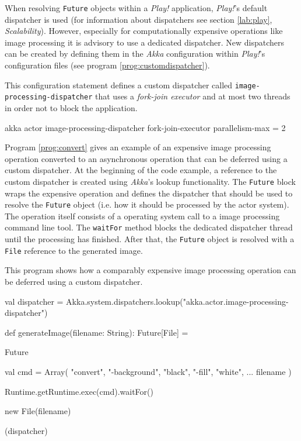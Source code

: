 When resolving \texttt{Future} objects within a \textit{Play!} application, \textit{Play!}'s default dispatcher is used (for information about dispatchers see section \ref{lab:play}, \textit{Scalability}). However, especially for computationally expensive operations like image processing it is advisory to use a dedicated dispatcher. New dispatchers can be created by defining them in the \textit{Akka} configuration within \textit{Play!}'s configuration files (see program \ref{prog:customdispatcher}).
\begin{program}
  \caption{This configuration statement defines a custom dispatcher called \texttt{image-processing-dispatcher} that uses a \textit{fork-join executor} and at most two threads in order not to block the application.}
  \label{prog:customdispatcher}
\begin{JavaCode}
akka {
    actor {
        image-processing-dispatcher {
            fork-join-executor {
                parallelism-max = 2
            }
        }
    }
}
\end{JavaCode}
\end{program}
Program \ref{prog:convert} gives an example of an expensive image processing operation converted to an asynchronous operation that can be deferred using a custom dispatcher. At the beginning of the code example, a reference to the custom dispatcher is created using \textit{Akka}'s lookup functionality. The \texttt{Future} block wraps the expensive operation and defines the dispatcher that should be used to resolve the \texttt{Future} object (i.e. how it should be processed by the actor system). The operation itself consists of a operating system call to a image processing command line tool. The \texttt{waitFor} method blocks the dedicated dispatcher thread until the processing has finished. After that, the \texttt{Future} object is resolved with a \texttt{File} reference to the generated image.

\begin{program}
  \caption{This program shows how a comparably expensive image processing operation can be deferred using a custom dispatcher.}
  \label{prog:convert}
  \begin{JavaCode}
val dispatcher = Akka.system.dispatchers.lookup("akka.actor.image-processing-dispatcher")

def generateImage(filename: String): Future[File] = {

    Future {

        val cmd = Array(
            "convert",
            "-background", "black",
            "-fill", "white",
            ...
            filename
        )

        Runtime.getRuntime.exec(cmd).waitFor()

        new File(filename)
    
    } (dispatcher)
    
}
  \end{JavaCode}
\end{program}


